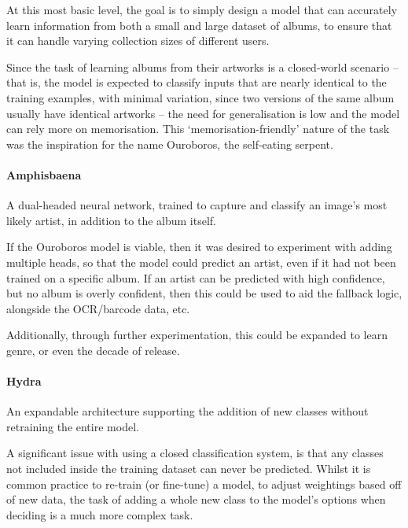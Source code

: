                 At this most basic level, the goal is to simply design a model that can accurately learn information from both a small and large dataset of albums, to ensure that it can handle varying collection sizes of different users.
    
                Since the task of learning albums from their artworks is a closed-world scenario -- that is, the model is expected to classify inputs that are nearly identical to the training examples, with minimal variation, since two versions of the same album usually have identical artworks -- the need for generalisation is low and the model can rely more on memorisation. This `memorisation-friendly' nature of the task was the inspiration for the name Ouroboros, the self-eating serpent.
    
                \paragraph{Amphisbaena} A dual-headed neural network, trained to capture and classify an image's most likely artist, in addition to the album itself.
    
                If the Ouroboros model is viable, then it was desired to experiment with adding multiple heads, so that the model could predict an artist, even if it had not been trained on a specific album. If an artist can be predicted with high confidence, but no album is overly confident, then this could be used to aid the fallback logic, alongside the OCR/barcode data, etc.
    
                Additionally, through further experimentation, this could be expanded to learn genre, or even the decade of release.
    
                \paragraph{Hydra} An expandable architecture supporting the addition of new classes without retraining the entire model.
                
    
                A significant issue with using a closed classification system, is that any classes not included inside the training dataset can never be predicted. Whilst it is common practice to re-train (or fine-tune) a model, to adjust weightings based off of new data, the task of adding a whole new class to the model's options when deciding is a much more complex task.
    
